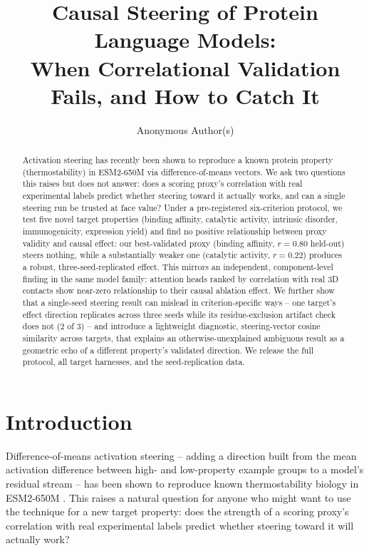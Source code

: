 \documentclass{article}
\title{Causal Steering of Protein Language Models: \\
When Correlational Validation Fails, and How to Catch It}
\author{Anonymous Author(s)}
\date{}
\begin{document}
\maketitle

\begin{abstract}
Activation steering has recently been shown to reproduce a known protein
property (thermostability) in ESM2-650M via difference-of-means vectors.
We ask two questions this raises but does not answer: does a scoring
proxy's correlation with real experimental labels predict whether steering
toward it actually works, and can a single steering run be trusted at
face value? Under a pre-registered six-criterion protocol, we test five
novel target properties (binding affinity, catalytic activity, intrinsic
disorder, immunogenicity, expression yield) and find no positive
relationship between proxy validity and causal effect: our
best-validated proxy (binding affinity, $r=0.80$ held-out) steers nothing,
while a substantially weaker one (catalytic activity, $r=0.22$) produces
a robust, three-seed-replicated effect. This mirrors an independent,
component-level finding in the same model family: attention heads ranked
by correlation with real 3D contacts show near-zero relationship to their
causal ablation effect. We further show that a single-seed steering
result can mislead in criterion-specific ways -- one target's effect
direction replicates across three seeds while its residue-exclusion
artifact check does not (2 of 3) -- and introduce a lightweight
diagnostic, steering-vector cosine similarity across targets, that
explains an otherwise-unexplained ambiguous result as a geometric echo of
a different property's validated direction. We release the full
protocol, all target harnesses, and the seed-replication data.
\end{abstract}

\section{Introduction}

Difference-of-means activation steering -- adding a direction built from
the mean activation difference between high- and low-property example
groups to a model's residual stream -- has been shown to reproduce known
thermostability biology in ESM2-650M \citep{huang2025steering}. This
raises a natural question for anyone who might want to use the technique
for a new target property: does the strength of a scoring proxy's
correlation with real experimental labels predict whether steering
toward it will actually work?
\end{document}
